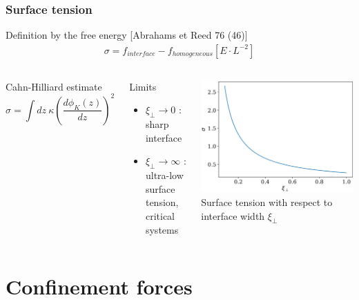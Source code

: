 \documentclass[9pt, dvipsnames,aspectratio=169]{beamer} %
\begin{document}
\begin{frame}
    \frametitle{Surface tension}
    \begin{block}{Definition by the free energy [Abrahams et Reed 76 (46)]}
        \begin{align}
            \sigma = f_{interface} - f_{homogeneous}  [E \cdot L^{-2}]
        \end{align}
    \end{block}
    \begin{columns}
    \begin{block}{Cahn-Hilliard estimate }
        \begin{equation}
            \sigma= \int dz\ {\kappa}\left(\frac{d\phi_K(z)}{dz}\right)^2 
        \end{equation}    
    \end{block}
    \begin{block}{Limits}
    	\begin{itemize}
			\item $\xi_\perp \to 0$ : sharp interface
			\item $\xi_\perp \to \infty$ : ultra-low surface tension, critical systems 	
    	\end{itemize}
    \end{block}
    \centering
    \includegraphics[width=0.8\linewidth]{tension-superficielle.pdf} \\    
	\small Surface tension with respect to interface width $\xi_\perp$
    \end{columns}
\end{frame}

\section{Confinement forces}
\end{document}
